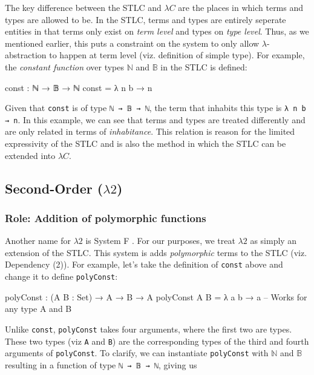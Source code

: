 \documentclass[12pt]{article}
\begin{document}
The key difference between the STLC and \(\lambda C\) are the places in which
terms and types are allowed to be. In the STLC, terms and types are entirely
seperate entities in that terms only exist on {\em term level} and types
on {\em type level}. Thus, as we mentioned earlier, this puts a constraint
on the system to only allow \(\lambda\)-abstraction to happen at term level
(viz. definition of simple type). For example, the \textit{constant function}
over types \(\mathbb{N}\) and \(\mathbb{B}\) in the STLC is defined:
\begin{center}
\begin{minipage}{0.5\textwidth}
\begin{code}
const : ℕ → 𝔹 → ℕ
const = λ n b → n
\end{code}
\end{minipage}
\end{center}
Given that {\tt const} is of type {\tt ℕ → 𝔹 → ℕ}, the term that inhabits this
type is {\tt λ n b → n}. In this example, we can see that terms and types are
treated differently and are only related in terms of {\em inhabitance}. This
relation is reason for the limited expressivity of the STLC and is also the
method in which the STLC can be extended into \(\lambda C\).

\subsection*{Second-Order (\(\lambda2\))}
\subsubsection*{Role: Addition of polymorphic functions}

Another name for \(\lambda2\) is System F \cite{}. For our purposes, we treat
\(\lambda2\) as simply an extension of the STLC. This system is adds
{\em polymorphic} terms to the STLC (viz. Dependency (2)). For example,
let's take the definition of {\tt const} above and change it to define
{\tt polyConst}:
\begin{center}
\begin{minipage}{0.5\textwidth}
\begin{code}
polyConst : (A B : Set) → A → B → A
polyConst A B = λ a b → a
-- Works for any type A and B
\end{code}
\end{minipage}
\end{center}

Unlike {\tt const}, {\tt polyConst} takes four arguments, where the first two
are types. These two types (viz {\tt A} and {\tt B}) are the corresponding
types of the third and fourth arguments of {\tt polyConst}. To clarify, we can
instantiate {\tt polyConst} with \(\mathbb{N}\) and \(\mathbb{B}\) resulting
in a function of type {\tt ℕ → 𝔹 → ℕ}, giving us
\end{document}
